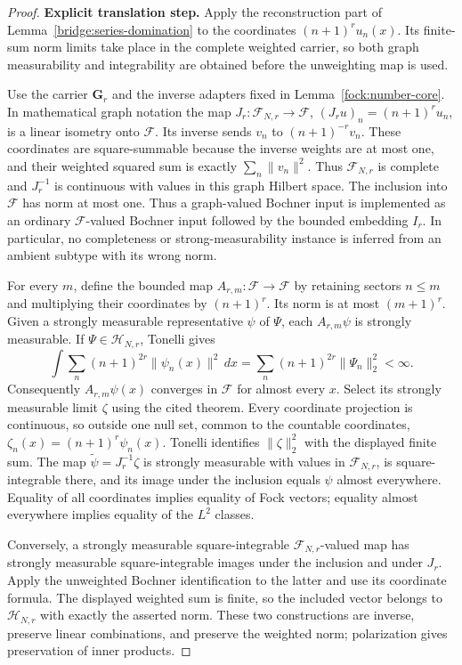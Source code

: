 \documentclass[11pt,a4paper]{article}
\theoremstyle{definition}
\theoremstyle{remark}
\begin{document}
\begin{proof}
\noindent\textbf{Explicit translation step.} Apply the reconstruction part of Lemma~\ref{bridge:series-domination}
to the coordinates $(n+1)^r u_n(x)$. Its finite-sum norm limits take place
in the complete weighted carrier, so both graph measurability and
integrability are obtained before the unweighting map is used.

Use the carrier $\mathbf G_r$ and the inverse adapters fixed in
Lemma~\ref{fock:number-core}. In mathematical graph notation the map
$J_r:\mathcal F_{N,r}\to\mathcal F$, $(J_ru)_n=(n+1)^ru_n$,
is a linear isometry onto $\mathcal F$. Its inverse sends $v_n$ to
$(n+1)^{-r}v_n$. These coordinates are square-summable because the
inverse weights are at most one, and their weighted squared sum is
exactly $\sum_n\|v_n\|^2$. Thus $\mathcal F_{N,r}$ is complete and
$J_r^{-1}$ is continuous with values in this graph Hilbert space.
The inclusion into $\mathcal F$ has norm at most one.
Thus a graph-valued Bochner input is implemented as an ordinary
$\mathcal F$-valued Bochner input followed by the bounded embedding
$I_r$. In particular, no completeness or strong-measurability
instance is inferred from an ambient subtype with its wrong norm.

For every $m$, define the bounded map $A_{r,m}:\mathcal F\to\mathcal F$
by retaining sectors $n\leq m$ and multiplying their coordinates by
$(n+1)^r$. Its norm is at most $(m+1)^r$. Given a strongly measurable
representative $\psi$ of $\Psi$, each $A_{r,m}\psi$ is strongly
measurable. If $\Psi\in\mathcal H_{N,r}$, Tonelli gives
\[
 \int\sum_n(n+1)^{2r}\|\psi_n(x)\|^2\,dx
     =\sum_n(n+1)^{2r}\|\Psi_n\|_2^2<\infty.
\]
Consequently $A_{r,m}\psi(x)$ converges in $\mathcal F$ for almost
every $x$. Select its strongly measurable limit $\zeta$ using the
cited theorem. Every coordinate projection is continuous, so outside
one null set, common to the countable coordinates,
$\zeta_n(x)=(n+1)^r\psi_n(x)$. Tonelli identifies $\|\zeta\|_2^2$
with the displayed finite sum. The map
$\widetilde\psi=J_r^{-1}\zeta$ is strongly measurable with values
in $\mathcal F_{N,r}$, is square-integrable there, and its image under
the inclusion equals $\psi$ almost everywhere. Equality of all
coordinates implies equality of Fock vectors; equality almost
everywhere implies equality of the $L^2$ classes.

Conversely, a strongly measurable square-integrable
$\mathcal F_{N,r}$-valued map has strongly measurable square-integrable
images under the inclusion and under $J_r$. Apply the unweighted
Bochner identification to the latter and use its coordinate formula.
The displayed weighted sum is finite, so the included vector belongs
to $\mathcal H_{N,r}$ with exactly the asserted norm. These two
constructions are inverse, preserve linear combinations, and preserve
the weighted norm; polarization gives preservation of inner products.


\end{proof}
\end{document}

